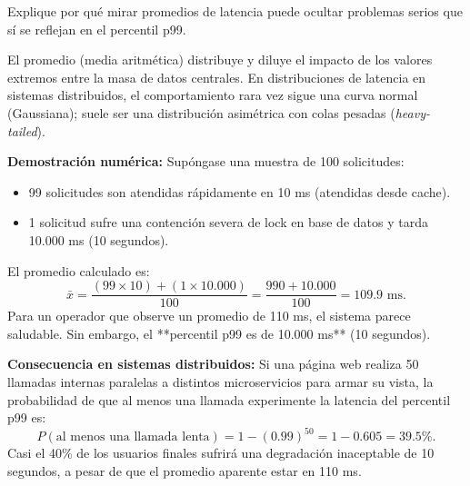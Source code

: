 \documentclass[variant=guia,cover=institutional,mode=screen]{ua-engineering-v6-article}
\begin{document}
\begin{uaexercise}
Explique por qué mirar promedios de latencia puede ocultar problemas serios que sí se reflejan en el percentil p99.
\end{uaexercise}
\begin{uaanswer}
El promedio (media aritmética) distribuye y diluye el impacto de los valores extremos entre la masa de datos centrales. En distribuciones de latencia en sistemas distribuidos, el comportamiento rara vez sigue una curva normal (Gaussiana); suele ser una distribución asimétrica con colas pesadas (\emph{heavy-tailed}).

\textbf{Demostración numérica:}
Supóngase una muestra de 100 solicitudes:
\begin{itemize}
\item 99 solicitudes son atendidas rápidamente en 10 ms (atendidas desde cache).
\item 1 solicitud sufre una contención severa de lock en base de datos y tarda 10.000 ms (10 segundos).
\end{itemize}
El promedio calculado es:
\[
\bar{x} = \frac{(99 \times 10) + (1 \times 10.000)}{100} = \frac{990 + 10.000}{100} = 109.9\text{ ms}.
\]
Para un operador que observe un promedio de 110 ms, el sistema parece saludable. Sin embargo, el **percentil p99 es de 10.000 ms** (10 segundos).

\textbf{Consecuencia en sistemas distribuidos:}
Si una página web realiza 50 llamadas internas paralelas a distintos microservicios para armar su vista, la probabilidad de que al menos una llamada experimente la latencia del percentil p99 es:
\[
P(\text{al menos una llamada lenta}) = 1 - (0.99)^{50} = 1 - 0.605 = 39.5\%.
\]
Casi el 40\% de los usuarios finales sufrirá una degradación inaceptable de 10 segundos, a pesar de que el promedio aparente estar en 110 ms.
\end{uaanswer}
\end{document}
